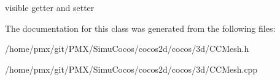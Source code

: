 visible getter and setter 

The documentation for this class was generated from the following files\+:\begin{DoxyCompactItemize}
\item 
/home/pmx/git/\+P\+M\+X/\+Simu\+Cocos/cocos2d/cocos/3d/C\+C\+Mesh.\+h\item 
/home/pmx/git/\+P\+M\+X/\+Simu\+Cocos/cocos2d/cocos/3d/C\+C\+Mesh.\+cpp\end{DoxyCompactItemize}
